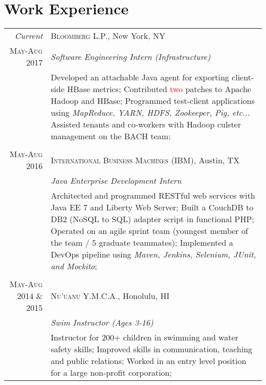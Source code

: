 \documentclass[a4paper,10pt]{article}
\begin{document}
\section{Work Experience}
\begin{tabular}{r|p{11cm}}

\emph{Current} & \textsc{\color{medRed}Bloomberg L.P.}, New York, NY \\
\textsc{May-Aug 2017}&\emph{Software Engineering Intern (Infrastructure)} \\
&\footnotesize{
Developed an attachable Java agent for exporting client-side HBase metrics; \newline
Contributed \textcolor{red}{two} patches to Apache Hadoop and HBase; \newline
Programmed test-client applications using \textit{MapReduce, YARN, HDFS, Zookeeper, Pig, etc...} \newline 
Assisted tenants and co-workers with Hadoop culster management on the BACH team; 
}\\\multicolumn{2}{c}{} \\

\textsc{May-Aug 2016} & \textsc{\color{medRed}International Business Machines (IBM)}, Austin, TX \\
&\emph{Java Enterprise Development Intern} \\
&\footnotesize{
Architected and programmed RESTful web services with Java EE 7 and Liberty Web Server; \newline
Built a CouchDB to DB2 (NoSQL to SQL) adapter script in functional PHP; \newline
Operated on an agile sprint team (youngest member of the team / 5 graduate teammates); \newline
Implemented a DevOps pipeline using \textit{Maven, Jenkins, Selenium, JUnit, and Mockito};  
}\\ \multicolumn{2}{c}{} \\

\textsc{May-Aug 2014 \& 2015} & \textsc{\color{medRed}Nu'uanu Y.M.C.A.}, Honolulu, HI \\
&\emph{Swim Instructor (Ages 3-16)} \\
&\footnotesize{
Instructor for 200+ children in swimming and water safety skills; \newline
Improved skills in communication, teaching and public relations; \newline
Worked in an entry level position for a large non-profit corporation; 
}\end{tabular}
\end{document}
